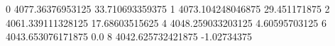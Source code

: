 0 4077.36376953125 33.710693359375
1 4073.104248046875 29.451171875
2 4061.339111328125 17.68603515625
4 4048.259033203125 4.60595703125
6 4043.653076171875 0.0
8 4042.625732421875 -1.02734375
